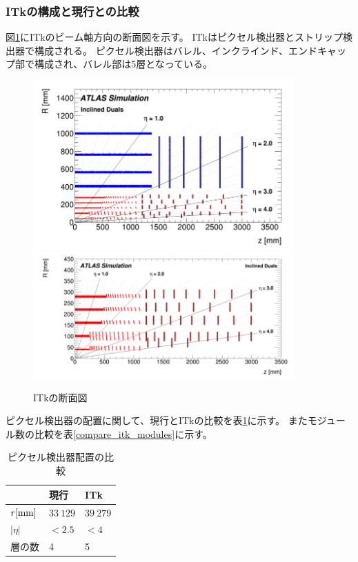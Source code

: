 \clearpage
\subsubsection{ITkの構成と現行との比較}
図\ref{itk_cross_section}にITkのビーム軸方向の断面図を示す。
ITkはピクセル検出器とストリップ検出器で構成される。
ピクセル検出器はバレル、インクラインド、エンドキャップ部で構成され、バレル部は5層となっている。

\begin{figure}[bpt]\centering
\includegraphics[width=10cm]{itk_cross_section}
\includegraphics[width=10cm]{itk_pixel_cross_section}
\caption[ITkの断面図]{ITkの断面図\cite{1-3}}
\label{itk_cross_section}
\end{figure}

ピクセル検出器の配置に関して、現行とITkの比較を表\ref{compare_itk_pixel}に示す。
またモジュール数の比較を表\ref{compare_itk_modules}に示す。

\begin{table}[tbp]
\begin{center}
\caption[ピクセル検出器配置の比較]{ピクセル検出器配置の比較}
\label{compare_itk_pixel}
  \begin{tabular}{|lll|} \hline
    & 現行 & ITk \\ \hline
    $r[\rm{mm}]$ & $33~129$ & $39~279$ \\ 
    $|\eta|$ & $<2.5$ & $<4$ \\ 
    層の数 & 4 & 5 \\ \hline
  \end{tabular}
\end{center}
\end{table}

